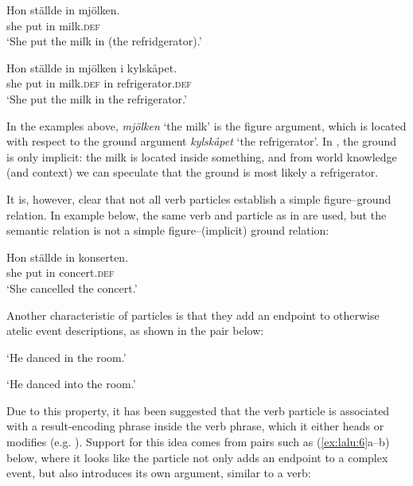 \documentclass[output=paper]{langscibook}
\begin{document}
\ex\label{ex:lalu:3b}
\gll  Hon   ställde   in  mjölken.\\
  she   put     in   milk.\textsc{def} \\
  \glt `She put the milk in (the refridgerator).’

\ex\label{ex:lalu:3c}
\gll  Hon   ställde   in   mjölken     i     kylskåpet.\\
  she   put     in   milk.\textsc{def}     in     refrigerator.\textsc{def}\\
\glt    ‘She put the milk in the refrigerator.’

\z
\z


In the examples above, \textit{mjölken} ‘the milk’ is the figure argument, which is located with respect to the ground argument \textit{kylskåpet} ‘the refrigerator’. In , the ground is only implicit: the milk is located inside something, and from world knowledge (and context) we can speculate that the ground is most likely a refrigerator.



It is, however, clear that not all verb particles establish a simple figure–ground relation. In example  below, the same verb and particle as in  are used, but the semantic relation is not a simple figure--(implicit) ground relation:


\ea\label{ex:lalu:4}
\gll  Hon   ställde   in   konserten.\\
  she       put         in   concert.\textsc{def}\\
\glt `She cancelled the concert.'

\z

Another characteristic of particles is that they add an endpoint to otherwise atelic event descriptions, as shown in the pair below:


\ea\label{ex:lalu:5}
\glt `He danced in the room.'

\glt `He danced into the room.'

\z
\z

Due to this property, it has been suggested that the verb particle is associated with a result-encoding phrase inside the verb phrase, which it either heads or modifies (e.g. \citealt{RamchandSvenonius2002}). Support for this idea comes from pairs such as (\ref{ex:lalu:6}a–b) below, where it looks like the particle not only adds an endpoint to a complex event, but also introduces its own argument, similar to a verb:
\end{document}
